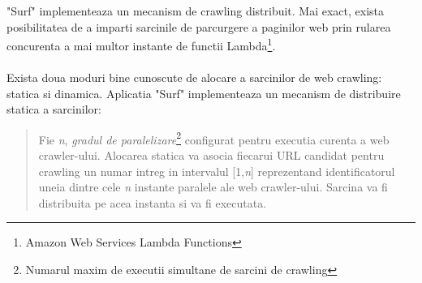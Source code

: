 "Surf" implementeaza un mecanism de crawling distribuit. Mai exact, exista posibilitatea de a imparti sarcinile de parcurgere a paginilor web prin rularea concurenta a mai multor instante de functii Lambda\footnote{Amazon Web Services Lambda Functions}.
\\
\\
Exista doua moduri bine cunoscute de alocare a sarcinilor de web crawling: statica si dinamica\cite{distribution-of-crawling-tasks}. Aplicatia "Surf" implementeaza un mecanism de distribuire statica a sarcinilor:
\begin{quote}
	Fie \emph{n}, \emph{gradul de paralelizare}\footnote{Numarul maxim de executii simultane de sarcini de crawling} configurat pentru executia curenta a web crawler-ului. Alocarea statica va asocia fiecarui URL candidat pentru crawling un numar intreg in intervalul [1,\emph{n}] reprezentand identificatorul uneia dintre cele \emph{n} instante paralele ale web crawler-ului. Sarcina va fi distribuita pe acea instanta si va fi executata.
\end{quote}
